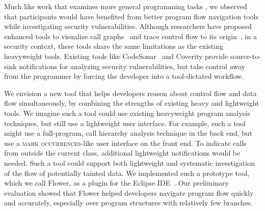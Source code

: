 \documentclass[10pt,journal,compsoc]{IEEEtran}
\begin{document}
Much like work that examines more general programming tasks \cite{latoza2010hard}, we observed that participants would have benefited from better program flow navigation tools while investigating security vulnerabilities.
Although researchers have proposed enhanced tools to visualize call graphs~\cite{latoza2011visualizing} and trace control flow to its origin~\cite{barnett2014getMeHere},
in a security context, these tools share the same limitations as the existing heavyweight tools.
Existing tools like CodeSonar~\cite{CodeSonar} and Coverity provide source-to-sink notifications for analyzing security
vulnerabilities, but take control away from the programmer by forcing the developer into a tool-dictated
workflow.


We envision a new tool that helps developers reason about control flow and data flow simultaneously,
by combining the strengths of existing heavy and lightweight tools.
We imagine such a tool could use existing heavyweight program analysis techniques, but still
use a lightweight user interface.
For example, such a tool might use a full-program, call hierarchy analysis technique in the back end,
but use a \textsc{mark occurrences}-like user interface on the front end.
To indicate calls from outside the current class, additional lightweight notifications would be needed.
Such a tool could support both lightweight and systematic investigation of the flow of 
potentially tainted data.
We implemented such a prototype tool, which we call Flower, as a plugin for the Eclipse IDE~\cite{Smith_etal:2017:flower}.
Our preliminary evaluation showed that Flower helped developers navigate program flow quickly and accurately, especially over program structures with relatively few branches.

\end{document}
